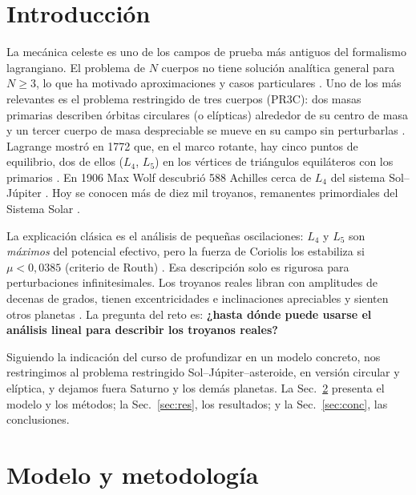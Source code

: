\documentclass[11pt, a4paper]{article}
\begin{document}
{\small\tableofcontents}

\section{Introducción}
La mecánica celeste es uno de los campos de prueba más antiguos del formalismo lagrangiano. El problema de $N$ cuerpos no tiene solución analítica general para $N\ge 3$, lo que ha motivado aproximaciones y casos particulares \cite{murray}. Uno de los más relevantes es el problema restringido de tres cuerpos (PR3C): dos masas primarias describen órbitas circulares (o elípticas) alrededor de su centro de masa y un tercer cuerpo de masa despreciable se mueve en su campo sin perturbarlas \cite{szebehely}. Lagrange mostró en 1772 que, en el marco rotante, hay cinco puntos de equilibrio, dos de ellos ($L_4$, $L_5$) en los vértices de triángulos equiláteros con los primarios \cite{lagrange}. En 1906 Max Wolf descubrió 588 Achilles cerca de $L_4$ del sistema Sol--Júpiter \cite{wolf}. Hoy se conocen más de diez mil troyanos, remanentes primordiales del Sistema Solar \cite{emery,bottke}.

La explicación clásica es el análisis de pequeñas oscilaciones: $L_4$ y $L_5$ son \emph{máximos} del potencial efectivo, pero la fuerza de Coriolis los estabiliza si $\mu<0{,}0385$ (criterio de Routh) \cite{murray}. Esa descripción solo es rigurosa para perturbaciones infinitesimales. Los troyanos reales libran con amplitudes de decenas de grados, tienen excentricidades e inclinaciones apreciables y sienten otros planetas \cite{robutel,oshima}. La pregunta del reto es: \textbf{¿hasta dónde puede usarse el análisis lineal para describir los troyanos reales?}

Siguiendo la indicación del curso de profundizar en un modelo concreto, nos restringimos al problema restringido Sol--Júpiter--asteroide, en versión circular y elíptica, y dejamos fuera Saturno y los demás planetas. La Sec.~\ref{sec:modelo} presenta el modelo y los métodos; la Sec.~\ref{sec:res}, los resultados; y la Sec.~\ref{sec:conc}, las conclusiones.

\section{Modelo y metodología}\label{sec:modelo}
\end{document}
